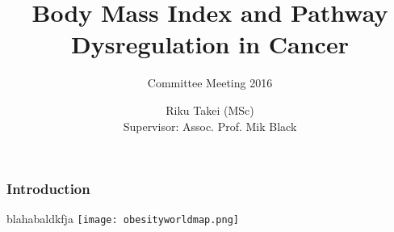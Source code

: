 \documentclass{beamer}
\title[BMI and Cancer Pathway]{Body Mass Index and Pathway Dysregulation in Cancer}
\subtitle{Committee Meeting 2016}
\author[Riku Takei]{Riku Takei (MSc)\\Supervisor: Assoc. Prof. Mik Black}
\institute{Department of Biochemistry, University of Otago}
\begin{document}
{
	\begin{frame}[noframenumbering]
		\titlepage
	\end{frame}
}

\begin{frame}
	\frametitle{Introduction}
	blahabaldkfja
	\texttt{[image: obesityworldmap.png]}
\end{frame}
\end{document}
